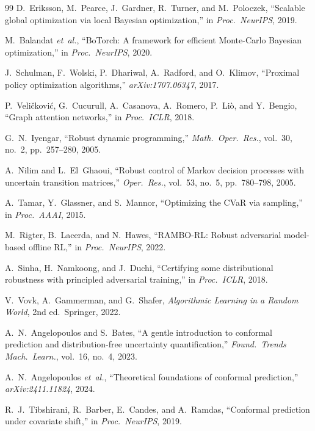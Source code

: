 \documentclass[journal]{IEEEtran}
\begin{document}
\begin{thebibliography}{99}
D.~Eriksson, M.~Pearce, J.~Gardner, R.~Turner, and M.~Poloczek, ``Scalable global optimization via local Bayesian optimization,'' in \emph{Proc.\ NeurIPS}, 2019.

M.~Balandat \emph{et~al.}, ``BoTorch: A framework for efficient Monte-Carlo Bayesian optimization,'' in \emph{Proc.\ NeurIPS}, 2020.

J.~Schulman, F.~Wolski, P.~Dhariwal, A.~Radford, and O.~Klimov, ``Proximal policy optimization algorithms,'' \emph{arXiv:1707.06347}, 2017.

P.~Veli\v{c}kovi\'c, G.~Cucurull, A.~Casanova, A.~Romero, P.~Li\`o, and Y.~Bengio, ``Graph attention networks,'' in \emph{Proc.\ ICLR}, 2018.

G.~N.~Iyengar, ``Robust dynamic programming,'' \emph{Math.\ Oper.\ Res.}, vol.~30, no.~2, pp.~257--280, 2005.

A.~Nilim and L.~El~Ghaoui, ``Robust control of Markov decision processes with uncertain transition matrices,'' \emph{Oper.\ Res.}, vol.~53, no.~5, pp.~780--798, 2005.

A.~Tamar, Y.~Glassner, and S.~Mannor, ``Optimizing the CVaR via sampling,'' in \emph{Proc.\ AAAI}, 2015.

M.~Rigter, B.~Lacerda, and N.~Hawes, ``RAMBO-RL: Robust adversarial model-based offline RL,'' in \emph{Proc.\ NeurIPS}, 2022.

A.~Sinha, H.~Namkoong, and J.~Duchi, ``Certifying some distributional robustness with principled adversarial training,'' in \emph{Proc.\ ICLR}, 2018.

V.~Vovk, A.~Gammerman, and G.~Shafer, \emph{Algorithmic Learning in a Random World}, 2nd ed.\ Springer, 2022.

A.~N.~Angelopoulos and S.~Bates, ``A gentle introduction to conformal prediction and distribution-free uncertainty quantification,'' \emph{Found.\ Trends Mach.\ Learn.}, vol.~16, no.~4, 2023.

A.~N.~Angelopoulos \emph{et~al.}, ``Theoretical foundations of conformal prediction,'' \emph{arXiv:2411.11824}, 2024.

R.~J.~Tibshirani, R.~Barber, E.~Candes, and A.~Ramdas, ``Conformal prediction under covariate shift,'' in \emph{Proc.\ NeurIPS}, 2019.


\end{thebibliography}
\end{document}
